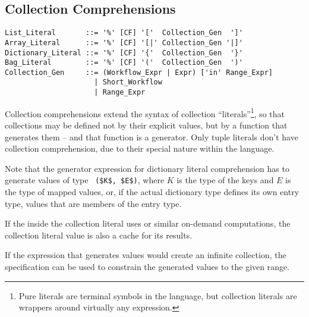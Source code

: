 



\subsection{Collection Comprehensions}
\label{sec:collection-comprehensions}

\grammar\begin{lstlisting}
List_Literal       ::= '%' [CF] '['  Collection_Gen  ']'
Array_Literal      ::= '%' [CF] '[|' Collection_Gen '|]'
Dictionary_Literal ::= '%' [CF] '{'  Collection_Gen  '}'
Bag_Literal        ::= '%' [CF] '('  Collection_Gen  ')'
Collection_Gen     ::= (Workflow_Expr | Expr) ['in' Range_Expr]
                     | Short_Workflow
                     | Range_Expr
\end{lstlisting}

Collection comprehensions extend the syntax of collection ``literals''\footnote{Pure literals are terminal symbols in the language, but collection literals are wrappers around virtually any expression.}, so that collections may be defined not by their explicit values, but by a function that generates them -- and that function is a generator. Only tuple literals don't have collection comprehension, due to their special nature within the language. 

Note that the generator expression for dictionary literal comprehension has to generate values of type ~\lstinline!($K$, $E$)!, where $K$ is the type of the keys and $E$ is the type of mapped values, or, if the actual dictionary type defines its own entry type, values that are members of the entry type. 

If the  inside the collection literal uses  or similar on-demand computations, the collection literal value is also a cache for its results. 

If the expression that generates values would create an infinite collection, the  specification can be used to constrain the generated values to the given range. 






